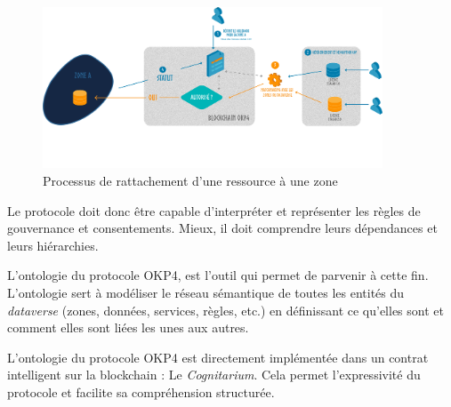 \begin{figure}
    \centering
    \includegraphics[width=0.9\textwidth]{ILLUSTRATIONS/rattachement_zone.png}
    \caption{Processus de rattachement d'une ressource à une zone}
    \label{fig:rattachement_d'une_ressource}
\end{figure}

Le protocole doit donc être capable d'interpréter et représenter les règles de gouvernance et consentements. Mieux, il doit comprendre leurs dépendances et leurs hiérarchies. 

L'ontologie du protocole OKP4, est l'outil qui permet de parvenir à cette fin. L'ontologie sert à modéliser le réseau sémantique de toutes les entités du \textit{dataverse} (zones, données, services, règles, etc.) en définissant ce qu'elles sont et comment elles sont liées les unes aux autres.

L'ontologie du protocole OKP4 est directement implémentée dans un contrat intelligent sur la blockchain : Le \textit{Cognitarium}. Cela permet l'expressivité du protocole et facilite sa compréhension structurée. 

\newpage
